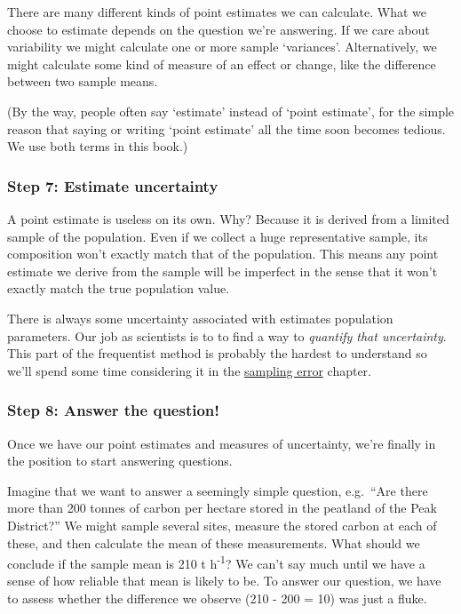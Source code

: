 \documentclass[
]{book}
\begin{document}
There are many different kinds of point estimates we can calculate. What we choose to estimate depends on the question we're answering. If we care about variability we might calculate one or more sample `variances'. Alternatively, we might calculate some kind of measure of an effect or change, like the difference between two sample means.

(By the way, people often say `estimate' instead of `point estimate', for the simple reason that saying or writing `point estimate' all the time soon becomes tedious. We use both terms in this book.)

\hypertarget{step-7-estimate-uncertainty}{%
\subsubsection*{Step 7: Estimate uncertainty}\label{step-7-estimate-uncertainty}}

A point estimate is useless on its own. Why? Because it is derived from a limited sample of the population. Even if we collect a huge representative sample, its composition won't exactly match that of the population. This means any point estimate we derive from the sample will be imperfect in the sense that it won't exactly match the true population value.

There is always some uncertainty associated with estimates population parameters. Our job as scientists is to to find a way to \emph{quantify that uncertainty}. This part of the frequentist method is probably the hardest to understand so we'll spend some time considering it in the \protect\hyperlink{sampling-error}{sampling error} chapter.

\hypertarget{step-8-answer-the-question}{%
\subsubsection*{Step 8: Answer the question!}\label{step-8-answer-the-question}}

Once we have our point estimates and measures of uncertainty, we're finally in the position to start answering questions.

Imagine that we want to answer a seemingly simple question, e.g.~``Are there more than 200 tonnes of carbon per hectare stored in the peatland of the Peak District?'' We might sample several sites, measure the stored carbon at each of these, and then calculate the mean of these measurements. What should we conclude if the sample mean is 210 t h\textsuperscript{-1}? We can't say much until we have a sense of how reliable that mean is likely to be. To answer our question, we have to assess whether the difference we observe (210 - 200 = 10) was just a fluke.
\end{document}
